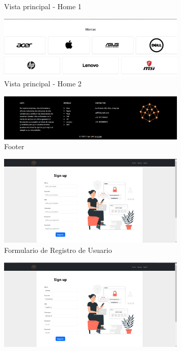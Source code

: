 \documentclass{article}
\begin{document}
\begin{itemize}
\begin{itemize}
\begin{figure}[H]
		      \caption{Vista principal - Home 1}
	   \end{figure}
    \begin{figure}[H]
		      \centering
                \includegraphics[width=0.8\textwidth,keepaspectratio]{img/marca.png}
		      \caption{Vista principal - Home 2}
	   \end{figure}
    \begin{figure}[H]
		      \centering
                \includegraphics[width=0.8\textwidth,keepaspectratio]{img/footer.png}
		      \caption{Footer}
	   \end{figure}
    \begin{figure}[H]
		      \centering
                \includegraphics[width=0.8\textwidth,keepaspectratio]{img/signup1.png}
		      \caption{Formulario de Registro de Usuario}
	   \end{figure}
    \begin{figure}[H]
		      \centering
                \includegraphics[width=0.8\textwidth,keepaspectratio]{img/signup2.png}

\end{figure}
\end{itemize}
\end{itemize}
\end{document}
